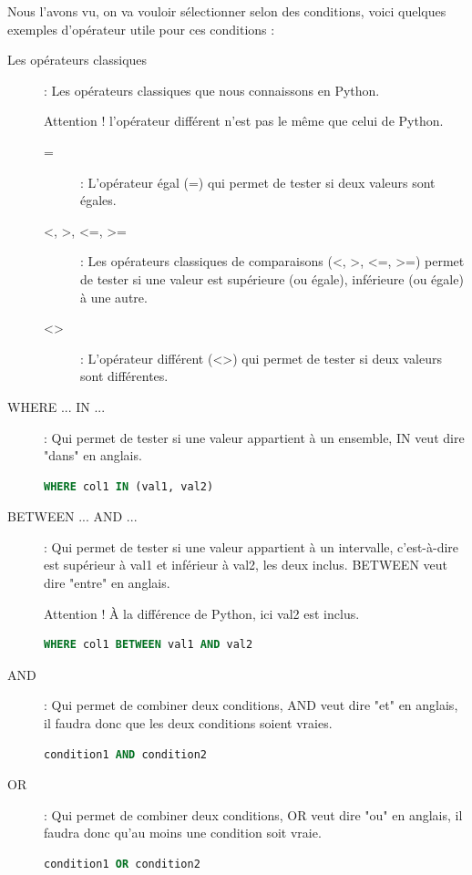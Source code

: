 Nous l'avons vu, on va vouloir sélectionner selon des conditions, voici quelques exemples d'opérateur utile pour ces conditions :
\begin{description}
    \item [Les opérateurs classiques]: Les opérateurs classiques que nous connaissons en Python.
    \begin{center}{ Attention ! l'opérateur différent n'est pas le même que celui de Python.}\end{center}
    \begin{description}
        \item[=]: L'opérateur égal (=) qui permet de tester si deux valeurs sont égales.
        \item[<, >, <=, >=]:  Les opérateurs classiques de comparaisons (<, >, <=, >=) permet de tester si une valeur est supérieure (ou égale), inférieure (ou égale) à une autre.
        \item[<>]: L'opérateur différent (<>) qui permet de tester si deux valeurs sont différentes.
    \end{description}
    \item [WHERE ... IN ...]: Qui permet de tester si une valeur appartient à un ensemble, IN veut dire "dans" en anglais. 
    \begin{lstlisting}[style=SQLstyle, language=SQL]
    WHERE col1 IN (val1, val2)
    \end{lstlisting}
    
    \item [BETWEEN ... AND ...]: Qui permet de tester si une valeur appartient à un intervalle, c'est-à-dire est supérieur à val1 et inférieur à val2, les deux inclus. BETWEEN veut dire "entre" en anglais.
    \begin{center}{ Attention ! À la différence de Python, ici val2 est inclus.}\end{center}
    \begin{lstlisting}[style=SQLstyle, language=SQL]
    WHERE col1 BETWEEN val1 AND val2
    \end{lstlisting}
    
    \item [AND]: Qui permet de combiner deux conditions, AND veut dire "et" en anglais, il faudra donc que les deux conditions soient vraies.
    \begin{lstlisting}[style=SQLstyle, language=SQL]
    condition1 AND condition2
    \end{lstlisting}
    
    \item [OR]: Qui permet de combiner deux conditions, OR veut dire "ou" en anglais, il faudra donc qu'au moins une condition soit vraie.
    \begin{lstlisting}[style=SQLstyle, language=SQL]
    condition1 OR condition2
    \end{lstlisting}
    

\end{description}
